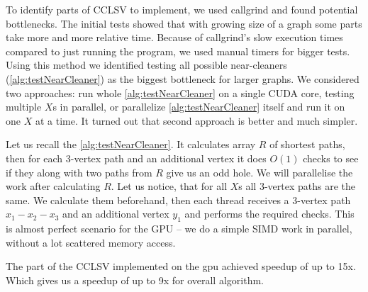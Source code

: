 

To identify parts of CCLSV to implement, we used callgrind and found potential bottlenecks. The initial tests showed that with growing size of a graph some parts take more and more relative time. Because of callgrind's slow execution times compared to just running the program, we used manual timers for bigger tests. Using this method we identified testing all possible near-cleaners (\cref{alg:testNearCleaner}) as the biggest bottleneck for larger graphs. We considered two approaches: run whole \cref{alg:testNearCleaner} on a single CUDA core, testing multiple $X$s in parallel, or parallelize \cref{alg:testNearCleaner} itself and run it on one $X$ at a time. It turned out that second approach is better and much simpler.

Let us recall the \cref{alg:testNearCleaner}. It calculates array $R$ of shortest paths, then for each 3-vertex path and an additional vertex it does $O(1)$ checks to see if they along with two paths from $R$ give us an odd hole. We will parallelise the work after calculating $R$. Let us notice, that for all $X$s all 3-vertex paths are the same. We calculate them beforehand, then each thread receives a 3-vertex path $x_1 - x_2 - x_3$ and an additional vertex $y_1$ and performs the required checks. This is almost perfect scenario for the GPU -- we do a simple SIMD work in parallel, without a lot scattered memory access.

The part of the CCLSV implemented on the gpu achieved speedup of up to 15x. Which gives us a speedup of up to 9x for overall algorithm.

